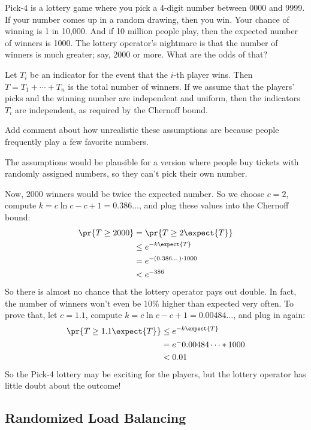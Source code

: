 Pick-4 is a lottery game where you pick a 4-digit number between 0000
and 9999.  If your number comes up in a random drawing, then you win.
Your chance of winning is 1 in 10,000.  And if 10 million people play,
then the expected number of winners is 1000.  The lottery operator's
nightmare is that the number of winners is much greater; say, 2000 or
more.  What are the odds of that?

Let $T_i$ be an indicator for the event that the $i$-th player wins.
Then $T = T_1 + \cdots + T_n$ is the total number of winners.  If we
assume that the players' picks and the winning number are independent
and uniform, then the indicators $T_i$ are independent, as required by
the Chernoff bound.  

\begin{editingnotes}
Add comment about how unrealistic these assumptions are because people
frequently play a few favorite numbers.

The assumptions would be plausible for a version where people buy
tickets with randomly assigned numbers, so they can't pick their own
number.
\end{editingnotes}

Now, 2000 winners would be twice the expected
number.  So we choose $c = 2$, compute $k = c \ln c - c + 1 =
0.386\dots$, and plug these values into the Chernoff bound:
\begin{align*}
\pr{T \geq 2000} & = \pr{T \geq 2 \expect{T}} \\
  & \leq e^{-k \expect{T}} \\
  & = e^{- (0.386\dots) \cdot 1000} \\
  & < e^{-386}
\end{align*}
So there is almost no chance that the lottery operator pays out
double.  In fact, the number of winners won't even be 10\% higher than
expected very often.  To prove that, let $c = 1.1$, compute $k = c \ln
c - c + 1 = 0.00484\dots$, and plug in again:
\begin{align*}
\pr{T \geq 1.1 \expect{T}} & \leq e^{-k \expect{T}} \\
  & = e^- 0.00484\dots * 1000 \\
  & < 0.01
\end{align*}
So the Pick-4 lottery may be exciting for the players, but the lottery
operator has little doubt about the outcome!

\subsection{Randomized Load Balancing}

